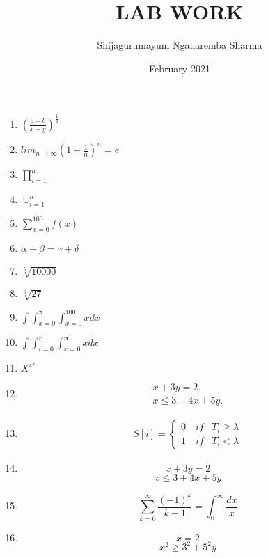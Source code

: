\documentclass{article}
\title{LAB WORK}
\author{Shijagurumayum Nganaremba Sharma }
\date{February 2021}
\begin{document}
\maketitle


\begin{enumerate}
    \item $(\frac{a+b}{x+y})^\frac{1}{3}$
    \item $lim_{n\to\infty}(1+\frac{1}{n})^n=e$
    \item $\prod_{i=1}^n$
    \item $\cup_{i=1}^n$
    \item $\sum_{x=0}^{100}f(x)$
    \item $\alpha + \beta = \gamma + \delta$
    \item $\sqrt[5]{10000}$
    \item $\sqrt[8]{27}$
    \item $\int \int_{x=0}^{\pi}\int_{x=0}^{100}xdx$
    \item $\int \int_{i=0}^{r}\int_{x=0}^{\infty}xdx$
    \item $X^{x^{x}}$
    \item {\begin{equation}
        \begin{split}
           x+3y=2.\\
           x \leq 3 + 4x + 5y.
        \end{split}
    \end{equation}}
    \item {\begin{equation}
        \begin{split}
            S[i]={\begin{cases}
            0 \quad if & T_i \geq \lambda\\
            1 \quad if & T_i < \lambda
            \end{cases}}
        \end{split}
    \end{equation}}
    
    \item {\begin{equation}
            x+3y=2
             \end{equation}
             \begin{equation}
                 x \le 3+4x+5y
             \end{equation}
    }
    
    \item {
        $$
            \sum_{k=0}^{\infty}\frac{(-1)^{k}}{k+1}=\int_0^{\infty}\frac{dx}{x}
        $$
    }
    
    \item {
        \begin{equation}
            x=2
        \end{equation}
        \begin{equation}
            x^2 \ge 3^2+5^2y
        \end{equation}
    }
    
\end{enumerate}
\end{document}
